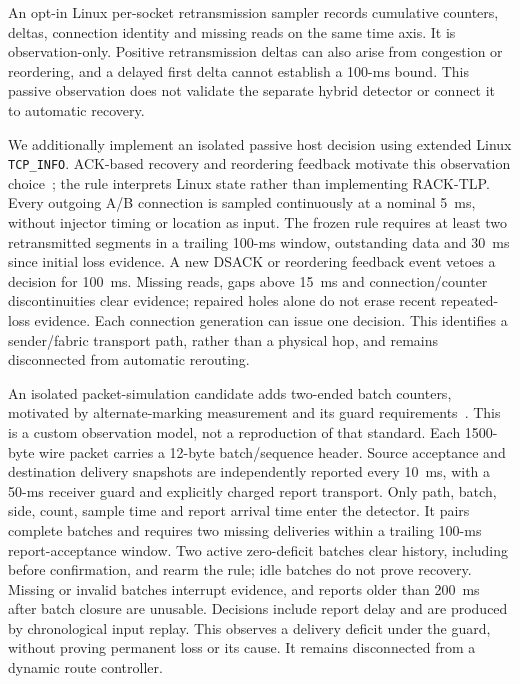 \documentclass[sigconf]{acmart}
\begin{document}
An opt-in Linux per-socket retransmission sampler records cumulative
counters, deltas, connection identity and missing reads on the same time
axis. It is observation-only. Positive retransmission deltas can also
arise from congestion or reordering, and a delayed first delta cannot
establish a 100-ms bound. This passive observation does not validate
the separate hybrid detector or connect it to automatic recovery.


We additionally implement an isolated passive host decision using
extended Linux \texttt{TCP\_INFO}. ACK-based recovery and reordering
feedback motivate this observation choice~\cite{rack2021}; the rule
interprets Linux state rather than implementing RACK-TLP. Every outgoing
A/B connection is sampled continuously at a nominal 5~ms, without
injector timing or location as input. The frozen rule requires at least
two retransmitted segments in a trailing 100-ms window, outstanding
data and 30~ms since initial loss evidence. A new DSACK or reordering
feedback event vetoes a decision for 100~ms. Missing reads, gaps above
15~ms and connection/counter discontinuities clear evidence; repaired
holes alone do not erase recent repeated-loss evidence. Each connection
generation can issue one decision. This identifies a sender/fabric
transport path, rather than a physical hop, and remains disconnected
from automatic rerouting.


An isolated packet-simulation candidate adds two-ended batch counters,
motivated by alternate-marking measurement and its guard requirements~\cite{alternateMarking2022}.
This is a custom observation model, not a reproduction of that standard.
Each 1500-byte wire packet carries a 12-byte batch/sequence header.
Source acceptance and destination delivery snapshots are independently
reported every 10~ms, with a 50-ms receiver guard and explicitly charged
report transport. Only path, batch, side, count, sample time and report
arrival time enter the detector. It pairs complete batches and requires
two missing deliveries within a trailing 100-ms report-acceptance window.
Two active zero-deficit batches clear history, including before
confirmation, and rearm the rule; idle batches do not prove recovery.
Missing or invalid batches interrupt evidence, and reports older than
200~ms after batch closure are unusable. Decisions include report delay
and are produced by chronological input replay. This observes a delivery
deficit under the guard, without proving permanent loss or its cause.
It remains disconnected from a dynamic route controller.
\end{document}
